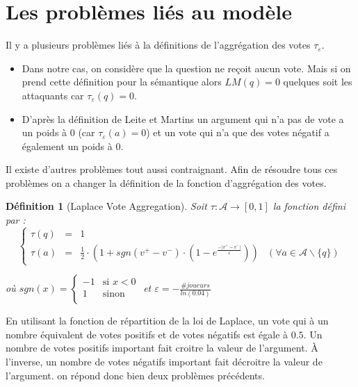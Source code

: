 \documentclass[11pt]{article}
\theoremstyle{defi}
\newtheorem{definition}{Définition}[section]
\theoremstyle{not}
\theoremstyle{prob}
\begin{document}
  \section{Les problèmes liés au modèle}
    Il y a plusieurs problèmes liés à la définitions de l'aggrégation des votes $\tau_\varepsilon$.
    \begin{itemize}
      \item Dans notre cas, on considère que la question ne reçoit aucun vote. Mais si on prend cette définition pour la sémantique alors $LM(q) = 0$ quelques soit les attaquants car $\tau_\varepsilon(q) = 0$.
      \item D'après la définition de Leite et Martins un argument qui n'a pas de vote a un poids à 0 (car $\tau_\varepsilon (a) = 0$) et un vote qui n'a que des votes négatif a également un poids à 0.
    \end{itemize}

    Il existe d'autres problèmes tout aussi contraignant. Afin de résoudre tous ces problèmes on a changer la définition de la fonction d'aggrégation des votes.

    \begin{definition}[Laplace Vote Aggregation]
      Soit $\tau : \mathcal{A} \rightarrow [0, 1]$ la fonction défini par :
      $$
        \left\{\begin{array}{llll}
          \tau(q) & = & 1 & \\
          \tau(a) & = & \frac{1}{2} \cdot \left(1 + sgn(v^+ - v^-) \cdot \left(1 - e^{\frac{-|v^+ - v^-|}{\varepsilon}}\right)\right) & (\forall a \in \mathcal{A} \backslash \{q\})
        \end{array}\right.
      $$

      où
      $sgn(x) = \left\{
        \begin{array}{ll}
          -1  & \mbox{si } x < 0 \\
          1 & \mbox{sinon} \\
        \end{array}
      \right.$
      et $\varepsilon = - \frac{\#joueurs}{ln(0.04)}$

    \end{definition}

    En utilisant la fonction de répartition de la loi de Laplace, un vote qui à un nombre équivalent de votes positifs et de votes négatifs est égale à $0.5$. Un nombre de votes positifs important fait croitre la valeur de l'argument. À l'inverse, un nombre de votes négatifs important fait décroitre la valeur de l'argument.
    on répond donc bien deux problèmes précédents.
\end{document}
